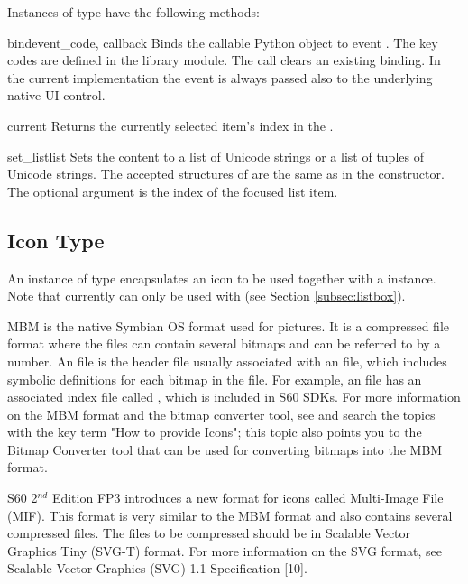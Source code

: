 Instances of  type have the following methods:

\begin{methoddesc}[Listbox]{bind}{event_code, callback}
Binds the callable Python object  to event 
. The key codes are defined in 
the  library module. The call
 clears an 
existing binding. In the current implementation the event is always passed 
also to the underlying native UI control.
\end{methoddesc}

\begin{methoddesc}[Listbox]{current}{}
Returns the currently selected item's index in the .
\end{methoddesc}

\begin{methoddesc}[Listbox]{set_list}{list}
Sets the  content to a list of Unicode strings or a
list of tuples of Unicode strings. The accepted structures of  are the
same as in the  constructor. The optional argument  is the index of the focused list item.
\end{methoddesc}

\subsection{Icon Type}
\label{subsec:icon}
An instance of  type encapsulates an icon to be used together 
with a  instance. Note that currently  can only 
be used with  (see Section \ref{subsec:listbox}).

MBM is the native Symbian OS format used for pictures. It is a
compressed file format where the files can contain several bitmaps and
can be referred to by a number. An  file is the header file
usually associated with an  file, which includes symbolic
definitions for each bitmap in the file. For example, an
 file has an associated index file called
, which is included in S60 SDKs. For more information
on the MBM format and the bitmap converter tool, see \cite{S60Doc} and
search the topics with the key term "How to provide Icons"; this topic
also points you to the Bitmap Converter tool that can be used for
converting bitmaps into the MBM format.

S60 2$^{nd}$ Edition FP3 introduces a new format for icons called 
Multi-Image File (MIF). This format is very similar to the MBM format and 
also contains several compressed files. The files to be compressed should be 
in Scalable Vector Graphics Tiny (SVG-T) format. For more information on the 
SVG format, see Scalable Vector Graphics (SVG) 1.1 Specification 
[10].

